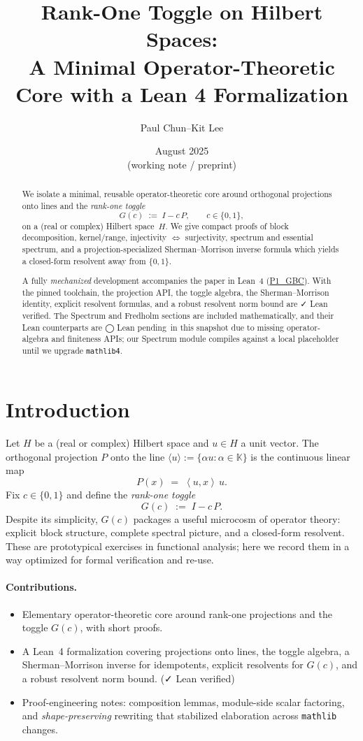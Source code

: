 \documentclass[11pt]{article}
\title{\textbf{Rank-One Toggle on Hilbert Spaces:\\
A Minimal Operator-Theoretic Core with a Lean 4 Formalization}}
\author{Paul Chun--Kit Lee}
\date{August 2025 \\[2pt] \small (working note / preprint)}
\theoremstyle{definition}
\newcommand{\K}{\mathbb{K}}
\newcommand{\ip}[2]{\left\langle #1,#2\right\rangle}
\newcommand{\leanRepoTag}{\href{https://github.com/AICardiologist/FoundationRelativity/tree/main/Papers/P1_GBC}{P1\_GBC}}
\newcommand{\leanok}{\textsf{\small \textcolor{green!60!black}{✓ Lean verified}}}
\newcommand{\leanpending}{\textsf{\small \textcolor{orange!80!black}{◯ Lean pending}}}
\begin{document}
\maketitle

\begin{abstract}
We isolate a minimal, reusable operator-theoretic core around orthogonal projections onto lines and the \emph{rank-one toggle}
\[
G(c)\;:=\;I - c\,P,\qquad c\in\{0,1\},
\]
on a (real or complex) Hilbert space~$H$. We give compact proofs of block decomposition, kernel/range, injectivity $\Leftrightarrow$ surjectivity, spectrum and essential spectrum, and a projection-specialized Sherman--Morrison inverse formula which yields a closed-form resolvent away from $\{0,1\}$.

A fully \emph{mechanized} development accompanies the paper in Lean~4 (\leanRepoTag). With the pinned toolchain, the projection API, the toggle algebra, the Sherman--Morrison identity, explicit resolvent formulas, and a robust resolvent norm bound are \leanok. The Spectrum and Fredholm sections are included mathematically, and their Lean counterparts are \leanpending\ in this snapshot due to missing operator-algebra and finiteness APIs; our Spectrum module compiles against a local placeholder until we upgrade \texttt{mathlib4}.
\end{abstract}

\tableofcontents

\section{Introduction}

Let $H$ be a (real or complex) Hilbert space and $u\in H$ a unit vector. The orthogonal projection $P$ onto the line $\langle u\rangle:=\{ \alpha u : \alpha\in\K\}$ is the continuous linear map
\[
P(x) \;=\; \ip{u}{x}\,u.
\]
Fix $c\in\{0,1\}$ and define the \emph{rank-one toggle}
\[
G(c) \;:=\; I - c\,P.
\]
Despite its simplicity, $G(c)$ packages a useful microcosm of operator theory: explicit block structure, complete spectral picture, and a closed-form resolvent. These are prototypical exercises in functional analysis; here we record them in a way optimized for formal verification and re-use.

\paragraph{Contributions.}
\begin{itemize}
\item Elementary operator-theoretic core around rank-one projections and the toggle $G(c)$, with short proofs.
\item A Lean~4 formalization covering projections onto lines, the toggle algebra, a Sherman--Morrison inverse for idempotents, explicit resolvents for $G(c)$, and a robust resolvent norm bound. (\leanok)
\item Proof-engineering notes: composition lemmas, module-side scalar factoring, and \emph{shape-preserving} rewriting that stabilized elaboration across \texttt{mathlib} changes.
\end{itemize}
\end{document}
